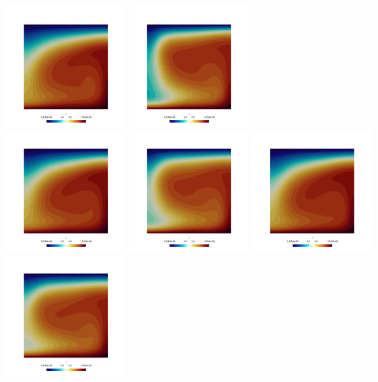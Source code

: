 \includegraphics[width=4cm]{python_codes/fieldstone_28/results_case5/T_0100}
\includegraphics[width=4cm]{python_codes/fieldstone_28/results_case5/T_0110}\\
\includegraphics[width=4cm]{python_codes/fieldstone_28/results_case5/T_0120}
\includegraphics[width=4cm]{python_codes/fieldstone_28/results_case5/T_0130}
\includegraphics[width=4cm]{python_codes/fieldstone_28/results_case5/T_0140}
\includegraphics[width=4cm]{python_codes/fieldstone_28/results_case5/T_0150}\\


